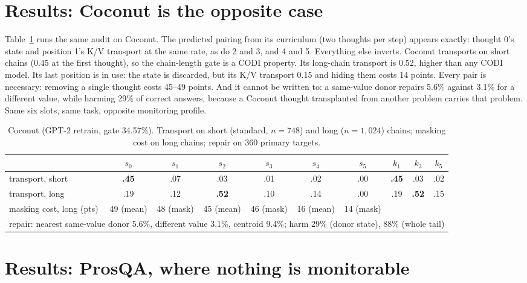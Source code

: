 \documentclass{article}
\begin{document}
\section{Results: Coconut is the opposite case}\label{sec:coconut}

Table~\ref{tab:coconut} runs the same audit on Coconut. The predicted pairing from its curriculum (two thoughts per step) appears exactly: thought 0's state and position 1's K/V transport at the same rate, as do 2 and 3, and 4 and 5. Everything else inverts. Coconut transports on short chains (0.45 at the first thought), so the chain-length gate is a CODI property. Its long-chain transport is 0.52, higher than any CODI model. Its last position is in use: the state is discarded, but its K/V transport 0.15 and hiding them costs 14 points. Every pair is necessary: removing a single thought costs 45--49 points. And it cannot be written to: a same-value donor repairs 5.6\% against 3.1\% for a different value, while harming 29\% of correct answers, because a Coconut thought transplanted from another problem carries that problem. Same six slots, same task, opposite monitoring profile.

\begin{table}[h]
\caption{Coconut (GPT-2 retrain, gate 34.57\%). Transport on short (standard, $n=748$) and long ($n=1{,}024$) chains; masking cost on long chains; repair on 360 primary targets.}
\label{tab:coconut}
\centering
\scriptsize
\setlength{\tabcolsep}{3pt}
\begin{tabular}{lcccccc|ccc}
\toprule
 & $s_0$ & $s_1$ & $s_2$ & $s_3$ & $s_4$ & $s_5$ & $k_1$ & $k_3$ & $k_5$ \\
\midrule
transport, short & \textbf{.45} & .07 & .03 & .01 & .02 & .00 & \textbf{.45} & .03 & .02 \\
transport, long & .19 & .12 & \textbf{.52} & .10 & .14 & .00 & .19 & \textbf{.52} & .15 \\
masking cost, long (pts) & 49 (mean) & 48 (mask) & 45 (mean) & 46 (mask) & 16 (mean) & 14 (mask) & & & \\
\midrule
\multicolumn{10}{l}{repair: nearest same-value donor 5.6\%, different value 3.1\%, centroid 9.4\%; harm 29\% (donor state), 88\% (whole tail)} \\
\bottomrule
\end{tabular}
\end{table}

\section{Results: ProsQA, where nothing is monitorable}\label{sec:prosqa}
\end{document}
